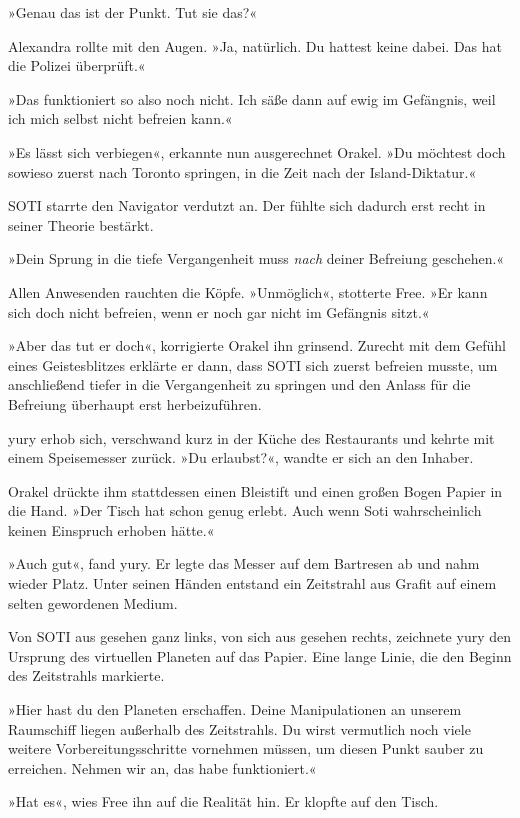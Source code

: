 »Genau das ist der Punkt. Tut sie das?«

Alexandra rollte mit den Augen. »Ja, natürlich. Du hattest keine dabei. Das hat die Polizei überprüft.«

»Das funktioniert so also noch nicht. Ich säße dann auf ewig im Gefängnis, weil ich mich selbst nicht befreien kann.«

»Es lässt sich verbiegen«, erkannte nun ausgerechnet Orakel. »Du möchtest doch sowieso zuerst nach Toronto springen, in die Zeit nach der Island-Diktatur.«

SOTI starrte den Navigator verdutzt an. Der fühlte sich dadurch erst recht in seiner Theorie bestärkt.

»Dein Sprung in die tiefe Vergangenheit muss \emph{nach} deiner Befreiung geschehen.«

Allen Anwesenden rauchten die Köpfe. »Unmöglich«, stotterte Free. »Er kann sich doch nicht befreien, wenn er noch gar nicht im Gefängnis sitzt.«

»Aber das tut er doch«, korrigierte Orakel ihn grinsend. Zurecht mit dem Gefühl eines Geistesblitzes erklärte er dann, dass SOTI sich zuerst befreien musste, um anschließend tiefer in die Vergangenheit zu springen und den Anlass für die Befreiung überhaupt erst herbeizuführen.

yury erhob sich, verschwand kurz in der Küche des Restaurants und kehrte mit einem Speisemesser zurück. »Du erlaubst?«, wandte er sich an den Inhaber.

Orakel drückte ihm stattdessen einen Bleistift und einen großen Bogen Papier in die Hand. »Der Tisch hat schon genug erlebt. Auch wenn Soti wahrscheinlich keinen Einspruch erhoben hätte.«

»Auch gut«, fand yury. Er legte das Messer auf dem Bartresen ab und nahm wieder Platz. Unter seinen Händen entstand ein Zeitstrahl aus Grafit auf einem selten gewordenen Medium.

Von SOTI aus gesehen ganz links, von sich aus gesehen rechts, zeichnete yury den Ursprung des virtuellen Planeten auf das Papier. Eine lange Linie, die den Beginn des Zeitstrahls markierte.

»Hier hast du den Planeten erschaffen. Deine Manipulationen an unserem Raumschiff liegen außerhalb des Zeitstrahls. Du wirst vermutlich noch viele weitere Vorbereitungsschritte vornehmen müssen, um diesen Punkt sauber zu erreichen. Nehmen wir an, das habe funktioniert.«

»Hat es«, wies Free ihn auf die Realität hin. Er klopfte auf den Tisch.

